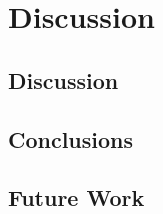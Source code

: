 \chapter{Discussion}
\label{chap:discussion}
\section{Discussion}

\section{Conclusions}

\section{Future Work}

\newpage


